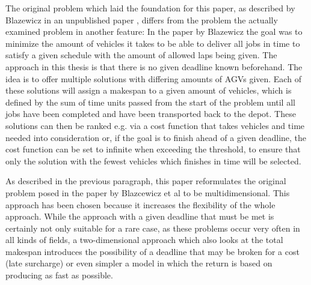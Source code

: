 The original problem which laid the foundation for this paper, as described by Blazewicz in an unpublished paper \cite{blazewicz198}, differs from the problem the actually examined
problem in another feature: In the paper by Blazewicz the goal was to minimize the amount of vehicles it takes to be able to
deliver all jobs in time to satisfy a given schedule with the amount of allowed laps being given. The approach in this thesis is that there is no
given deadline known beforehand. The idea is to offer multiple solutions with differing amounts of AGVs given. Each of these solutions will assign
a makespan to a given amount of vehicles, which is defined by the sum of time units passed from the start of the problem until all jobs have been
completed and have been transported back to the depot. These solutions can then be ranked e.g. via
a cost function that takes vehicles and time needed into consideration or, if the goal is to finish ahead of a given deadline, the cost function
can be set to infinite when exceeding the threshold, to ensure that only the solution with the fewest vehicles which finishes in time will be selected.

As described in the previous paragraph, this paper reformulates the original problem posed in the paper by Blazcewicz et al to be multidimensional. This
approach has been chosen because it increases the flexibility of the whole approach. While the approach with a given deadline that must be met
is certainly not only suitable for a rare case, as these problems occur very often in all kinds of fields, a two-dimensional approach which also
looks at the total makespan introduces the possibility of a deadline that may be broken for a cost (late surcharge) or even simpler a model in
which the return is based on producing as fast as possible.